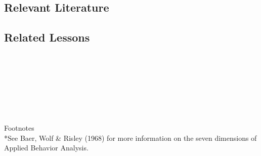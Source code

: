 \subsection{Relevant Literature}
\begin{refsection}
\nocite{baer1968some,
        cooper2007applied,
        gresham1993treatment,
        johnston2010strategies,
        peterson1982integrity}
\printbibliography[heading=none]
\end{refsection}
%
\subsection{Related Lessons}
\fourbEleven{}\\
\fouriOne{}\\
\fouriFour{}\\
\fourjOne{}\\
\fourFKSeven{}\\
\fourFKEleven{}\\
\fourFKThirtyThree{}\\
%
Footnotes\\
*See Baer, Wolf \& Risley (1968) for more information on the seven dimensions of Applied Behavior Analysis.
